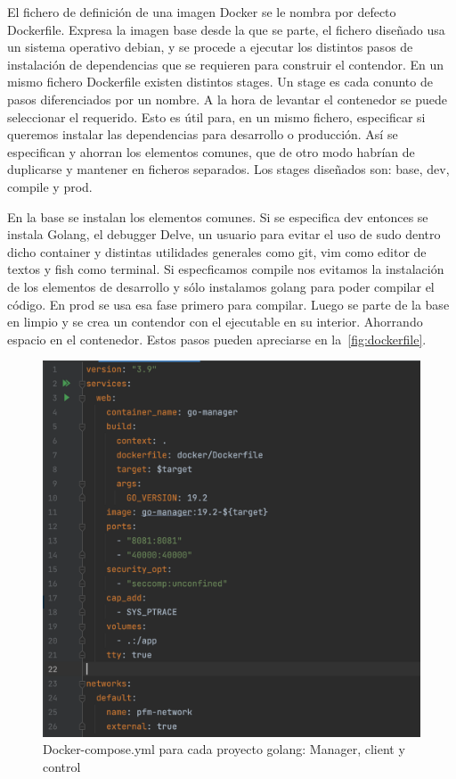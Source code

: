 
El fichero de definición de una imagen Docker se le nombra por defecto Dockerfile.
Expresa la imagen base desde la que se parte, el fichero diseñado usa un sistema operativo debian, y se procede a ejecutar los distintos pasos de instalación de dependencias que se requieren para construir el contendor.
En un mismo fichero Dockerfile existen distintos stages.
Un stage es cada conunto de pasos diferenciados por un nombre.
A la hora de levantar el contenedor se puede seleccionar el requerido.
Esto es útil para, en un mismo fichero, especificar si queremos instalar las dependencias para desarrollo o producción.
Así se especifican y ahorran los elementos comunes, que de otro modo habrían de duplicarse y mantener en ficheros separados.
Los stages diseñados son: base, dev, compile y prod.

En la base se instalan los elementos comunes.
Si se especifica dev entonces se instala Golang, el debugger Delve, un usuario para evitar el uso de sudo dentro dicho container y distintas utilidades generales como git, vim como editor de textos y fish como terminal.
Si especficamos compile nos evitamos la instalación de los elementos de desarrollo y sólo instalamos golang para poder compilar el código.
En prod se usa esa fase primero para compilar.
Luego se parte de la base en limpio y se crea un contendor con el ejecutable en su interior.
Ahorrando espacio en el contenedor.
Estos pasos pueden apreciarse en la~\cref{fig:dockerfile}.

\begin{figure}[H]
    \centering
    \includegraphics[scale = 0.6]{part/Proyecto_ejecutivo/memoria_constructiva/docker/docker-compose}
    \caption{Docker-compose.yml para cada proyecto golang: Manager, client y control}\label{fig:dockercompose}
\end{figure}

